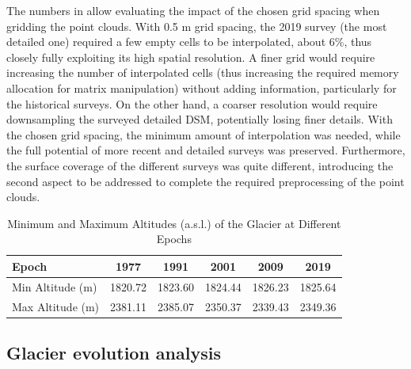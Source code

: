 The numbers in  allow evaluating the impact of the chosen grid spacing when gridding the point clouds. 
With 0.5 m grid spacing, the 2019 survey (the most detailed one) required a few empty cells to be interpolated, about 6\%, thus closely fully exploiting its high spatial resolution. 
A finer grid would require increasing the number of interpolated cells (thus increasing the required memory allocation for matrix manipulation) without adding information, particularly for the historical surveys.
On the other hand, a coarser resolution would require downsampling the surveyed detailed DSM, potentially losing finer details. 
With the chosen grid spacing, the minimum amount of interpolation was needed, while the full potential of more recent and detailed surveys was preserved. 
Furthermore, the surface coverage of the different surveys was quite different, introducing the second aspect to be addressed to complete the required preprocessing of the point clouds.

\begin{table}[ht]
  \centering
  \caption{Minimum and Maximum Altitudes (a.s.l.) of the Glacier at Different Epochs}
  \label{tab:2:glacier_altitudes}
  \begin{tabular}{lccccc}
    \hline
    Epoch & 1977 & 1991 & 2001 & 2009 & 2019 \\
    \hline
    Min Altitude (m) & 1820.72 & 1823.60 & 1824.44 & 1826.23 & 1825.64 \\
    Max Altitude (m) & 2381.11 & 2385.07 & 2350.37 & 2339.43 & 2349.36 \\
    \hline
  \end{tabular}
\end{table}

\subsection{Glacier evolution analysis}\label{sec:2:res_glacier_evolution}

